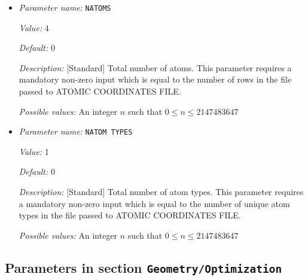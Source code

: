 \begin{itemize}
{\it Possible values:} Any string
\item {\it Parameter name:} {\tt NATOMS}
\label{parameters:Geometry/NATOMS}


{\it Value:} 4


{\it Default:} 0


{\it Description:} [Standard] Total number of atoms. This parameter requires a mandatory non-zero input which is equal to the number of rows in the file passed to ATOMIC COORDINATES FILE.


{\it Possible values:} An integer $n$ such that $0\leq n \leq 2147483647$
\item {\it Parameter name:} {\tt NATOM TYPES}
\label{parameters:Geometry/NATOM TYPES}
\label{parameters:Geometry/NATOM_20TYPES}


{\it Value:} 1


{\it Default:} 0


{\it Description:} [Standard] Total number of atom types. This parameter requires a mandatory non-zero input which is equal to the number of unique atom types in the file passed to ATOMIC COORDINATES FILE.


{\it Possible values:} An integer $n$ such that $0\leq n \leq 2147483647$
\end{itemize}



\subsection{Parameters in section \tt Geometry/Optimization}
\label{parameters:Geometry/Optimization}


